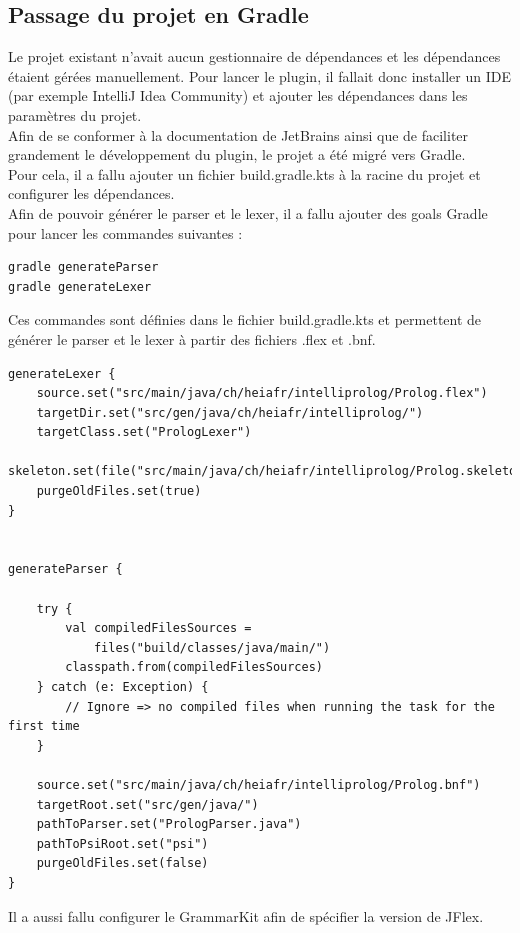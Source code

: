 \subsection{Passage du projet en Gradle}
\noindent
Le projet existant n'avait aucun gestionnaire de dépendances et les dépendances étaient gérées manuellement.
Pour lancer le plugin, il fallait donc installer un IDE (par exemple IntelliJ Idea Community) et ajouter les dépendances dans les paramètres du projet.
\\ \noindent Afin de se conformer à la documentation de JetBrains ainsi que de faciliter grandement le développement du plugin, le projet a été migré vers Gradle.
\\\noindent Pour cela, il a fallu ajouter un fichier build.gradle.kts à la racine du projet et configurer les dépendances.
\\ \noindent Afin de pouvoir générer le parser et le lexer, il a fallu ajouter des goals Gradle pour lancer les commandes suivantes :
\begin{lstlisting}[caption={Génération du parser et du lexer}, label={lst:gen_parser_lexer}]
gradle generateParser
gradle generateLexer
\end{lstlisting}


\noindent Ces commandes sont définies dans le fichier build.gradle.kts et permettent de générer le parser et le lexer à partir des fichiers .flex et .bnf.
\begin{lstlisting}[caption={Gradle pour la génération du parser et du lexer}, label={lst:gradle_lexer_parser}]
generateLexer {
    source.set("src/main/java/ch/heiafr/intelliprolog/Prolog.flex")
    targetDir.set("src/gen/java/ch/heiafr/intelliprolog/")
    targetClass.set("PrologLexer")
    skeleton.set(file("src/main/java/ch/heiafr/intelliprolog/Prolog.skeleton"))
    purgeOldFiles.set(true)
}


generateParser {

    try {
        val compiledFilesSources =
            files("build/classes/java/main/")
        classpath.from(compiledFilesSources)
    } catch (e: Exception) {
        // Ignore => no compiled files when running the task for the first time
    }

    source.set("src/main/java/ch/heiafr/intelliprolog/Prolog.bnf")
    targetRoot.set("src/gen/java/")
    pathToParser.set("PrologParser.java")
    pathToPsiRoot.set("psi")
    purgeOldFiles.set(false)
}
\end{lstlisting}
\noindent Il a aussi fallu configurer le GrammarKit afin de spécifier la version de JFlex.

